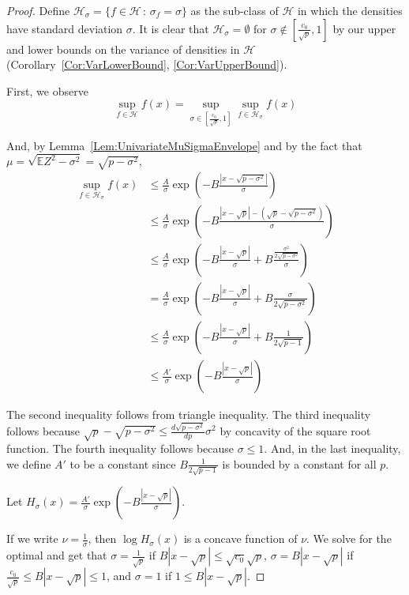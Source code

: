 \documentclass[12pt]{article}
\begin{document}
\begin{proof}

Define $\mathcal{H}_\sigma = \{ f \in \mathcal{H} \,:\, \sigma_f = \sigma \}$ as the sub-class of $\mathcal{H}$ in which the densities have standard deviation $\sigma$. It is clear that $\mathcal{H}_\sigma = \emptyset$ for $\sigma \notin [\frac{c_0}{\sqrt{p}}, 1]$ by our upper and lower bounds on the variance of densities in $\mathcal{H}$ (Corollary~\ref{Cor:VarLowerBound}, \ref{Cor:VarUpperBound}).

First, we observe
\[
\sup_{f \in \mathcal{H}} f(x) = \sup_{\sigma \in [\frac{c_0}{\sqrt{p}}, 1]} \sup_{f \in \mathcal{H}_\sigma} f(x) 
\]

And, by Lemma~\ref{Lem:UnivariateMuSigmaEnvelope} and by the fact that $\mu = \sqrt{ \mathbb{E} Z^2 - \sigma^2} = \sqrt{ p - \sigma^2}$, 
\begin{align*}
\sup_{f \in \mathcal{H}_\sigma} f(x) 
      & \leq \frac{A}{\sigma} \exp \left( - B \frac{| x - \sqrt{p - \sigma^2} |}{\sigma} \right) \\
   &\leq  \frac{A}{\sigma} \exp \left( - B \frac{| x - \sqrt{p} | - (\sqrt{p} - \sqrt{p - \sigma^2}) }{\sigma} \right) \\
   &\leq \frac{A}{\sigma} \exp \left( - B \frac{| x - \sqrt{p} |}{\sigma} 
                     + B \frac{ \frac{\sigma^2}{2 \sqrt{p - \sigma^2}}}{\sigma} \right)\\
    &= \frac{A}{\sigma} \exp \left( - B \frac{| x - \sqrt{p} |}{\sigma} 
                     + B \frac{\sigma}{2 \sqrt{p - \sigma^2}} \right)\\
   &\leq \frac{A}{\sigma} \exp \left( - B \frac{| x - \sqrt{p} |}{\sigma} 
                     + B \frac{1}{2 \sqrt{p - 1}} \right)\\
    &\leq \frac{A'}{\sigma} \exp \left( - B \frac{| x - \sqrt{p} |}{\sigma} \right)
\end{align*}

The second inequality follows from triangle inequality. The third inequality follows because $\sqrt{p} - \sqrt{p - \sigma^2} \leq  \frac{d \sqrt{ p - \sigma^2} }{dp} \sigma^2$ by concavity of the square root function. The fourth inequality follows because $\sigma \leq 1$. And, in the last inequality, we define $A'$ to be a constant since $B \frac{1}{2 \sqrt{p-1}}$ is bounded by a constant for all $p$. 

Let $H_\sigma(x) =  \frac{A'}{\sigma} \exp \left( - B \frac{| x - \sqrt{p} |}{\sigma} \right)$.

If we write $\nu = \frac{1}{\sigma}$, then $\log H_\sigma (x)$ is a concave function of $\nu$. We solve for the optimal and get that $\sigma = \frac{1}{\sqrt{p}}$ if $B | x - \sqrt{p}| \leq \sqrt{c_0}{\sqrt{p}}$, $\sigma = B | x - \sqrt{p} |$ if $\frac{c_0}{\sqrt{p}} \leq B | x - \sqrt{p} | \leq 1$, and $\sigma = 1$ if $1 \leq B | x - \sqrt{p} |$. 


\end{proof}
\end{document}
